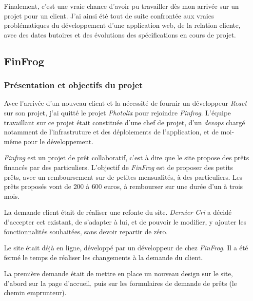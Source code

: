 \documentclass[12pt,a4paper]{article}
\begin{document}
  \bigskip

  Finalement, c'est une vraie chance d'avoir pu travailler dès mon arrivée
  sur un projet pour un client. J'ai ainsi été tout de suite confrontée
  aux vraies problématiques du développement d'une application web, de la
  relation cliente, avec des dates butoires et des évolutions des
  spécifications en cours de projet.

  \subsection{FinFrog}\label{finfrog}

  \subsubsection{Présentation et objectifs du
  projet}\label{pruxe9sentation-et-objectifs-du-projet-1}

  \bigskip

  Avec l'arrivée d'un nouveau client et la nécessité de fournir un
  développeur \emph{React} sur son projet, j'ai quitté le projet
  \emph{Photolix} pour rejoindre \emph{Finfrog}. L'équipe travaillant sur
  ce projet était constituée d'une chef de projet, d'un \emph{devops}
  chargé notamment de l'infrastruture et des déploiements de
  l'application, et de moi-même pour le développement.

  \bigskip

  \emph{Finfrog} est un projet de prêt collaboratif, c'est à dire que le
  site propose des prêts financés par des particuliers. L'objectif de
  \emph{FinFrog} est de proposer des petits prêts, avec un remboursement
  sur de petites mensualités, à des particuliers. Les prêts proposés vont
  de 200 à 600 euros, à rembourser sur une durée d'un à trois mois.

  \bigskip
  La demande client était de réaliser une refonte du site. \emph{Dernier
  Cri} a décidé d'accepter cet existant, de s'adapter à lui, et de pouvoir
  le modifier, y ajouter les fonctionnalités souhaitées, sans devoir
  repartir de zéro.

  \bigskip

  Le site était déjà en ligne, développé par un développeur de chez
  \emph{FinFrog}. Il a été fermé le temps de réaliser les changements à la
  demande du client.

  \bigskip

  La première demande était de mettre en place un nouveau design sur le
  site, d'abord sur la page d'accueil, puis sur les formulaires de demande
  de prêts (le chemin emprunteur).
\end{document}
